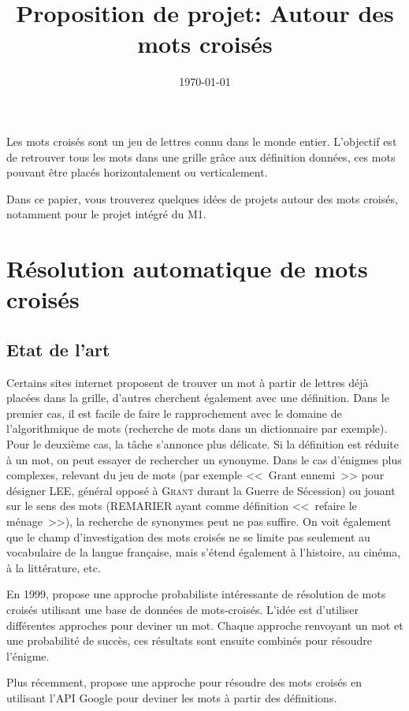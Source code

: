 \documentclass{article}
\title{Proposition de projet: Autour des mots croisés}
\author{}
\date{\today}
\begin{document}
\maketitle

Les mots croisés sont un jeu de lettres connu dans le monde entier. L'objectif est de retrouver tous les mots dans une grille grâce aux définition données, ces mots pouvant être placés horizontalement ou verticalement.

Dans ce papier, vous trouverez quelques idées de projets autour des mots croisés, notamment pour le projet intégré du M1.

\section{Résolution automatique de mots croisés}

\subsection{Etat de l'art}

Certains sites internet proposent de trouver un mot à partir de lettres déjà placées dans la grille, d'autres cherchent également avec une définition. Dans le premier cas, il est facile de faire le rapprochement avec le domaine de l'algorithmique de mots (recherche de mots dans un dictionnaire par exemple). Pour le deuxième cas, la tâche s'annonce plus délicate. Si la définition est réduite à un mot, on peut essayer de rechercher un synonyme. Dans le cas d'énigmes plus complexes, relevant du jeu de mots (par exemple <<~Grant ennemi~>> pour désigner LEE, général opposé à \textsc{Grant} durant la Guerre de Sécession) ou jouant sur le sens des mots (REMARIER ayant comme définition <<~refaire le ménage~>>), la recherche de synonymes peut ne pas suffire. On voit également que le champ d'investigation des mots croisés ne se limite pas seulement au vocabulaire de la langue française, mais s'étend également à l'histoire, au cinéma, à la littérature, etc.

En 1999, \cite{proverb} propose une approche probabiliste intéressante de résolution de mots croisés utilisant une base de données de mots-croisés. L'idée est d'utiliser différentes approches pour deviner un mot. Chaque approche renvoyant un mot et une probabilité de succès, ces résultats sont ensuite combinés pour résoudre l'énigme.

Plus récemment, \cite{GCV} propose une approche pour résoudre des mots croisés en utilisant l'API Google pour deviner les mots à partir des définitions.
\end{document}
